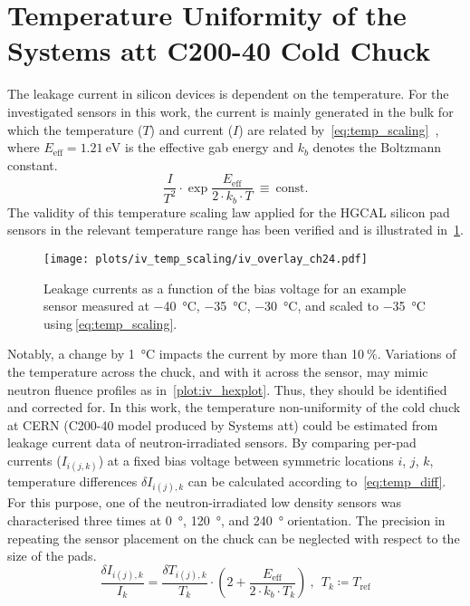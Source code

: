 \section{Temperature Uniformity of the Systems att C200-40 Cold Chuck}
\label{appendix:chuck_temp}
The leakage current in silicon devices is dependent on the temperature.
For the investigated sensors in this work, the current is mainly generated in the bulk for which the temperature ($T$) and current ($I$) are related by~\ref{eq:temp_scaling}~\cite{Chilingarov_2013}, where $E_\text{eff}=\SI{1.21}{\electronvolt}$ is the effective gab energy and $k_b$ denotes the Boltzmann constant.
\begin{equation}
    \frac{I}{T^2}\cdot \exp{\frac{E_\text{eff}}{2\cdot k_b \cdot T}}~\equiv~\text{const.}
    \label{eq:temp_scaling}
\end{equation}
The validity of this temperature scaling law applied for the HGCAL silicon pad sensors in the relevant temperature range has been verified and is illustrated in~\ref{plot:iv_tempscaling}.
\begin{figure}[h]
	\centering
	\texttt{[image: plots/iv\_temp\_scaling/iv\_overlay\_ch24.pdf]}
	\caption{
		Leakage currents as a function of the bias voltage for an example sensor measured at \SI{-40}{\celsius}, \SI{-35}{\celsius}, \SI{-30}{\celsius}, and scaled to \SI{-35}{\celsius} using$~$\ref{eq:temp_scaling}.
		}
	\label{plot:iv_tempscaling}
	\end{figure}
Notably, a change by \SI{1}{\celsius} impacts the current by more than 10$~\%$. 
Variations of the temperature across the chuck, and with it across the sensor, may mimic neutron fluence profiles as in~\ref{plot:iv_hexplot}. 
Thus, they should be identified and corrected for.\newline
In this work, the temperature non-uniformity of the cold chuck at CERN (C200-40 model produced by Systems att) could be estimated from leakage current data of neutron-irradiated sensors.
By comparing per-pad currents ($I_{i(j,k)}$) at a fixed bias voltage between symmetric locations $i$, $j$, $k$, temperature differences $\delta I_{i(j), k}$ can be calculated according to~\ref{eq:temp_diff}.
For this purpose, one of the neutron-irradiated low density sensors was characterised three times at \SI{0}{\degree}, \SI{120}{\degree}, and \SI{240}{\degree} orientation.
The precision in repeating the sensor placement on the chuck can be neglected with respect to the size of the pads. 
\begin{equation}
    \frac{\delta I_{i(j),k}}{I_k} = \frac{\delta T_{i(j), k}}{T_k} \cdot \left(2 + \frac{E_\text{eff}}{2\cdot k_b \cdot T_k} \right)~,~~T_k \coloneqq T_\text{ref}
    \label{eq:temp_diff}
\end{equation}
